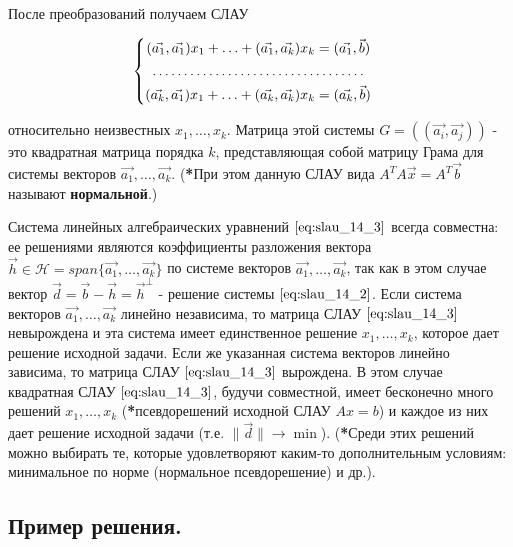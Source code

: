 \bigbreak

После преобразований получаем СЛАУ

\begin{equation}
    \begin{cases}
        \begin{aligned}
            (\vec{a_1}, \vec{a_1}) x_1 + \ldots + (\vec{a_1}, \vec{a_k})x_k &= (\vec{a_1}, \vec{b}) \\
            \hdotsfor{2} \\
            (\vec{a_k}, \vec{a_1}) x_1 + \ldots + (\vec{a_k}, \vec{a_k})x_k &= (\vec{a_k}, \vec{b}) \\
        \end{aligned}
    \end{cases}
    \label{eq:slau_14_3}
\end{equation}

относительно неизвестных $x_1, \ldots, x_k$. Матрица этой системы $G = ((\vec{a_i}, \vec{a_j}))$ - это квадратная матрица порядка $k$, представляющая собой матрицу Грама для системы векторов $\vec{a_1}, \ldots, \vec{a_k}$. (\textbf{*}При этом данную СЛАУ вида $A^TA\vec{x} = A^T\vec{b}$ называют \textbf{нормальной}.)

Система линейных алгебраических уравнений $\eqref{eq:slau_14_3}$ всегда совместна: ее решениями являются коэффициенты разложения вектора $\vec{h} \in \mathcal{H} = span\{\vec{a_1}, \ldots, \vec{a_k}\}$ по системе векторов $\vec{a_1}, \ldots, \vec{a_k}$, так как в этом случае вектор $\vec{d} = \vec{b} - \vec{h} = \vec{h}^\perp$ - решение системы $\eqref{eq:slau_14_2}$. Если система векторов $\vec{a_1}, \ldots, \vec{a_k}$ линейно независима, то матрица СЛАУ $\eqref{eq:slau_14_3}$ невырождена и эта система имеет единственное решение $x_1, \ldots, x_k$, которое дает решение исходной задачи. Если же указанная система векторов линейно зависима, то матрица СЛАУ $\eqref{eq:slau_14_3}$ вырождена. В этом случае квадратная СЛАУ $\eqref{eq:slau_14_3}$, будучи совместной, имеет бесконечно много решений $x_1, \ldots, x_k$ (\textbf{*}псевдорешений исходной СЛАУ $Ax = b$) и каждое из них дает решение исходной задачи (т.е. $\lVert \vec{d} \rVert \to \min$). (\textbf{*}Среди этих решений можно выбирать те, которые удовлетворяют каким-то дополнительным условиям: минимальное по норме (нормальное псевдорешение) и др.).

\subsection{
    Пример решения.
}


